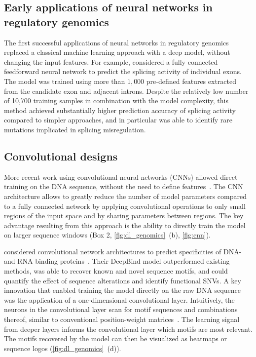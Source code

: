 \subsection{Early applications of neural networks in regulatory genomics}
The first successful applications of neural networks in regulatory genomics replaced a classical machine learning approach with a deep model, without changing the input features. For example, \citet{xiong_human_2015} considered a fully connected feedforward neural network to predict the splicing activity of individual exons. The model was trained using more than $1,000$ pre-defined features extracted from the candidate exon and adjacent introns. Despite the relatively low number of 10,700 training samples in combination with the model complexity, this method achieved substantially higher prediction accuracy of splicing activity compared to simpler approaches, and in particular was able to identify rare mutations implicated in splicing misregulation.

\subsection{Convolutional designs}
More recent work using convolutional neural networks (CNNs) allowed direct training on the DNA sequence, without the need to define features~\citep{alipanahi_predicting_2015,angermueller_accurate_2017,kelley_basset:_2016,zhou_predicting_2015}. The CNN architecture allows to greatly reduce the number of model parameters compared to a fully connected network by applying convolutional operations to only small regions of the input space and by sharing parameters between regions. The key advantage resulting from this approach is the ability to directly train the model on larger sequence windows (Box 2, \autoref{fig:dl_genomics}~(b), \autoref{fig:cnn}).

\citet{alipanahi_predicting_2015} considered convolutional network architectures to predict specificities of DNA- and RNA binding proteins~\citep{alipanahi_predicting_2015}. Their DeepBind model outperformed existing methods, was able to recover known and novel sequence motifs, and could quantify the effect of sequence alterations and identify functional SNVs. A key innovation that enabled training the model directly on the raw DNA sequence was the application of a one-dimensional convolutional layer. Intuitively, the neurons in the convolutional layer scan for motif sequences and combinations thereof, similar to conventional position-weight matrices~\citep{stormo_use_1982}. The learning signal from deeper layers informs the convolutional layer which motifs are most relevant. The motifs recovered by the model can then be visualized as heatmaps or sequence logos (\autoref{fig:dl_genomics}~(d)).


